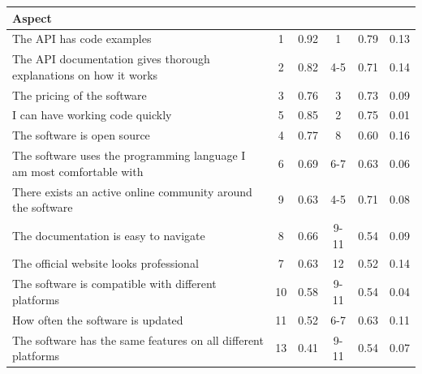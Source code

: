 \documentclass{article}
\begin{document}
\begin{table}[H]
\centering
\begin{tabularx}{\columnwidth}{X|c:c|c:c|c}

\textbf{Aspect}                                                    &     & &   & & \\ \hline
The API has code examples                                             &         1 & 0.92       &            1 & 0.79           & 0.13  \\ \hline
The API documentation gives thorough explanations on how it works     &         2 & 0.82       &          4-5 & 0.71           & 0.14  \\ \hline
The pricing of the software                                           &         3 & 0.76       &            3 & 0.73           & 0.09  \\ \hline
I can have working code quickly                                       &         5 & 0.85       &            2 & 0.75           & 0.01  \\ \hline
The software is open source                                           &         4 & 0.77       &            8 & 0.60           & 0.16  \\ \hline
The software uses the programming language I am most comfortable with &         6 & 0.69       &          6-7 & 0.63           & 0.06  \\ \hline
There exists an active online community around the software           &         9 & 0.63       &          4-5 & 0.71           & 0.08  \\ \hline
The documentation is easy to navigate                                 &         8 & 0.66       &         9-11 & 0.54           & 0.09  \\ \hline
The official website looks professional                               &         7 & 0.63       &           12 & 0.52           & 0.14  \\ \hline
The software is compatible with different platforms                   &        10 & 0.58       &         9-11 & 0.54           & 0.04  \\ \hline
How often the software is updated                                     &        11 & 0.52       &          6-7 & 0.63           & 0.11  \\ \hline
The software has the same features on all different platforms         &        13 & 0.41       &         9-11 & 0.54           & 0.07  \\ \hline

\end{tabularx}
\end{table}
\end{document}
